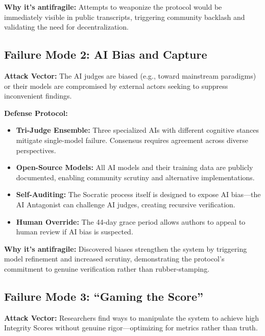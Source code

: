 \documentclass[11pt,a4paper]{article}
\begin{document}
\begin{small}
\textbf{Why it's antifragile:} Attempts to weaponize the protocol would be immediately visible in public transcripts, triggering community backlash and validating the need for decentralization.

\subsection{Failure Mode 2: AI Bias and Capture}
\textbf{Attack Vector:} The AI judges are biased (e.g., toward mainstream paradigms) or their models are compromised by external actors seeking to suppress inconvenient findings.

\textbf{Defense Protocol:}
\begin{itemize}[nosep]
    \item \textbf{Tri-Judge Ensemble:} Three specialized AIs with different cognitive stances mitigate single-model failure. Consensus requires agreement across diverse perspectives.
    \item \textbf{Open-Source Models:} All AI models and their training data are publicly documented, enabling community scrutiny and alternative implementations.
    \item \textbf{Self-Auditing:} The Socratic process itself is designed to expose AI bias—the AI Antagonist can challenge AI judges, creating recursive verification.
    \item \textbf{Human Override:} The 44-day grace period allows authors to appeal to human review if AI bias is suspected.
\end{itemize}

\textbf{Why it's antifragile:} Discovered biases strengthen the system by triggering model refinement and increased scrutiny, demonstrating the protocol's commitment to genuine verification rather than rubber-stamping.

\subsection{Failure Mode 3: ``Gaming the Score''}
\textbf{Attack Vector:} Researchers find ways to manipulate the system to achieve high Integrity Scores without genuine rigor—optimizing for metrics rather than truth.


\end{small}
\end{document}
